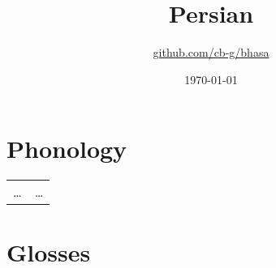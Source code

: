\documentclass{article}
\title{Persian\\\ipa{[f6:R"si:]}}
\author{\href{https://github.com/cb-g/bhasa}{github.com/cb-g/bhasa}}
\date{\today}
\begin{document}
\pagecolor{custom_bg}\color{custom_fg}
\maketitle\thispagestyle{empty}

\newpage\setcounter{page}{1}\section{Phonology}

\begin{table}[H]
  \color{custom_fg}
  \begin{tabular}{ll}
    \dots & \dots \\
  \end{tabular}
\end{table}

\newpage\section{Glosses}
\end{document}
